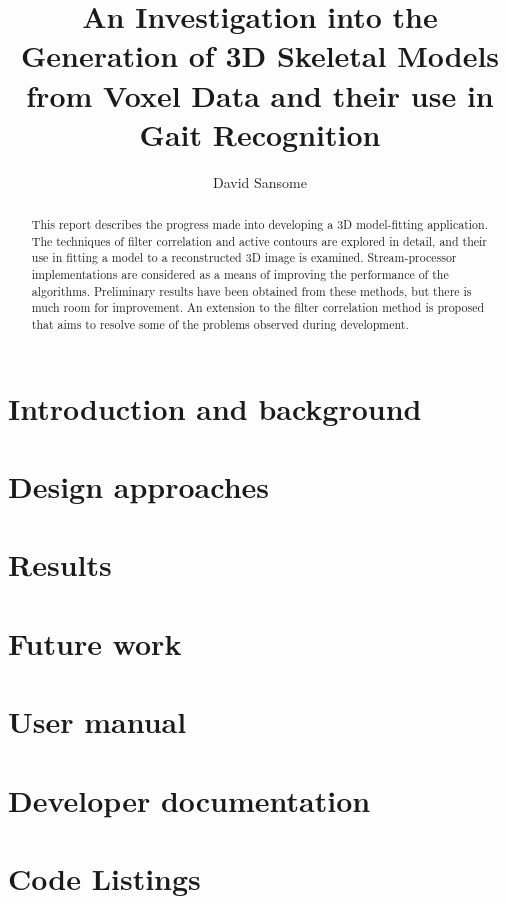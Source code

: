 \documentclass[a4paper,12pt]{report}
\title{An Investigation into the Generation of 3D Skeletal Models from Voxel Data and their use in Gait Recognition}
\author{David Sansome}
\begin{document}


\maketitle

\begin{abstract}
	This report describes the progress made into developing a 3D model-fitting application.
	The techniques of filter correlation and active contours are explored in detail, and their use in fitting a model to a reconstructed 3D image is examined.
	Stream-processor implementations are considered as a means of improving the performance of the algorithms.
	Preliminary results have been obtained from these methods, but there is much room for improvement.
	An extension to the filter correlation method is proposed that aims to resolve some of the problems observed during development.
\end{abstract}

\newpage

\tableofcontents

\chapter{Introduction and background}

\clearpage
\clearpage


\chapter{Design approaches}

\clearpage
\clearpage
\clearpage
\clearpage
\clearpage
\clearpage
\clearpage


\chapter{Results}

\clearpage
\clearpage


\chapter{Future work}



\newpage


\newpage
\appendix

\chapter{User manual}


\chapter{Developer documentation}


\chapter{Code Listings}

\end{document}
